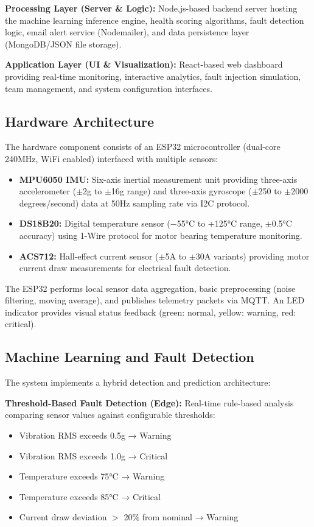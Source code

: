 \documentclass[conference]{IEEEtran}
\begin{document}
\textbf{Processing Layer (Server \& Logic):} Node.js-based backend server hosting the machine learning inference engine, health scoring algorithms, fault detection logic, email alert service (Nodemailer), and data persistence layer (MongoDB/JSON file storage).

\textbf{Application Layer (UI \& Visualization):} React-based web dashboard providing real-time monitoring, interactive analytics, fault injection simulation, team management, and system configuration interfaces.

\subsection{Hardware Architecture}

The hardware component consists of an ESP32 microcontroller (dual-core 240MHz, WiFi enabled) interfaced with multiple sensors:

\begin{itemize}
\item \textbf{MPU6050 IMU:} Six-axis inertial measurement unit providing three-axis accelerometer ($\pm$2g to $\pm$16g range) and three-axis gyroscope ($\pm$250 to $\pm$2000 degrees/second) data at 50Hz sampling rate via I2C protocol.
\item \textbf{DS18B20:} Digital temperature sensor (−55°C to +125°C range, $\pm$0.5°C accuracy) using 1-Wire protocol for motor bearing temperature monitoring.
\item \textbf{ACS712:} Hall-effect current sensor ($\pm$5A to $\pm$30A variants) providing motor current draw measurements for electrical fault detection.
\end{itemize}

The ESP32 performs local sensor data aggregation, basic preprocessing (noise filtering, moving average), and publishes telemetry packets via MQTT. An LED indicator provides visual status feedback (green: normal, yellow: warning, red: critical).

\subsection{Machine Learning and Fault Detection}

The system implements a hybrid detection and prediction architecture:

\textbf{Threshold-Based Fault Detection (Edge):} Real-time rule-based analysis comparing sensor values against configurable thresholds:
\begin{itemize}
\item Vibration RMS exceeds 0.5g → Warning
\item Vibration RMS exceeds 1.0g → Critical
\item Temperature exceeds 75°C → Warning  
\item Temperature exceeds 85°C → Critical
\item Current draw deviation $>$ 20\% from nominal → Warning
\end{itemize}
\end{document}
